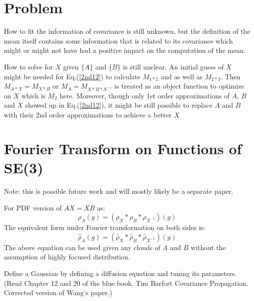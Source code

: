 \documentclass[twocolumn,10pt]{asme2ej}
\begin{document}
\section{Problem}
How to fit the information of covariance is still unknown, but the definition of the mean itself contains some information that is related to its covariance which might or might not have had a positive impact on the computation of the mean. 

How to solve for $X$ given $\{A\}$ and $\{B\}$ is still unclear. An initial guess of $X$ might be needed for Eq.(\ref{2nd12}) to calculate $M_{1*2}$ and as well as $M_{2*3}$. Then $M_{A*X} = M_{X*B}$ or $M_{A} = M_{X*B*X^{-1}}$ is treated as an object function to optimize on $X$ which is $M_2$ here. Moreover, though only 1st order approximations of $A$, $B$ and $X$ showed up in Eq.(\ref{2nd12}), it might be still possible to replace $A$ and $B$ with their 2nd order approximations to achieve a better $X$

\section{Fourier Transform on Functions of SE(3)}
Note: this is possible future work and will mostly likely be a separate paper.

For PDF version of $AX=XB$ as:
\begin{equation}
\rho_{A}(g) = \left( \rho_{X} * \rho_{B} * \rho_{X^{-1}} \right)(g)
\end{equation}
The equivalent form under Fourier transformation on both sides is:
\begin{equation}
\widehat{\rho}_{A}(g) = \left(\widehat{\rho}_{X}*\widehat{\rho}_{B}*\widehat{\rho}_{{X}^{-1}}\right)(g)
\end{equation}
The above equation can be used given any clouds of $A$ and $B$ without the assumption of highly focused distribution. 

Define a Gaussian by defining a diffusion equation and tuning its parameters. (Read Chapter 12 and 20 of the blue book. Tim Barfort Covariance Propagation. Corrected version of Wang's paper.)











\end{document}
